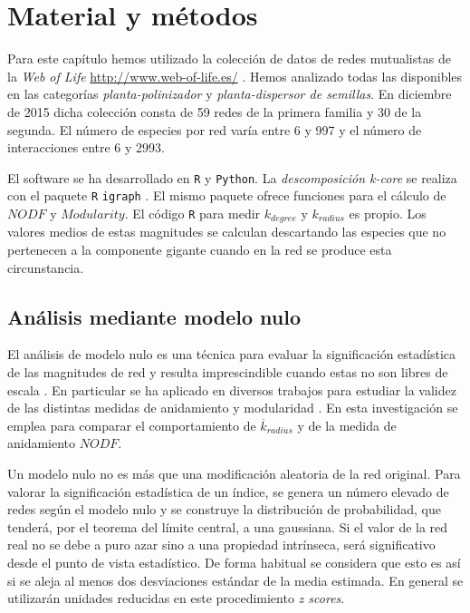 \section{Material y métodos}

Para este capítulo hemos utilizado la colección de datos de redes mutualistas de la \textit{Web of Life}  \url{http://www.web-of-life.es/} \cite{fortuna2014web}. Hemos analizado todas las disponibles en las categorías \textit{planta-polinizador} y \textit{planta-dispersor de semillas}. En diciembre de 2015 dicha colección consta de 59 redes de la primera familia y 30 de la segunda. El número de especies por red varía entre 6 y 997 y el número de interacciones entre 6 y 2993.

El software se ha desarrollado en \texttt{R} y \texttt{Python}. La \textit{descomposición k-core} se realiza con el paquete \texttt{R} \texttt{igraph} \cite{csardi2006igraph}. El mismo paquete ofrece funciones para el cálculo de $NODF$ y $Modularity$. El código \texttt{R} para medir ${k}_{degree}$ y ${k}_{radius}$ es propio. Los valores medios de estas magnitudes se calculan descartando las especies que no pertenecen a la componente gigante cuando en la red se produce esta circunstancia. 

\subsection{Análisis mediante modelo nulo}
\label{sec:nullmodels}

El análisis de modelo nulo es una técnica para evaluar la significación estadística de las magnitudes de red y resulta imprescindible cuando estas no son libres de escala \cite{gotelli1996null}. En particular se ha aplicado en diversos trabajos para estudiar la validez de las distintas medidas de anidamiento \cite{ulrich2013pattern, feng2014heterogeneity} y modularidad \cite{fortuna2010nestedness, mello2011modularity}. En esta investigación se emplea para comparar el comportamiento de $\overline k_{radius}$ y de la medida de anidamiento $NODF$.

Un modelo nulo no es más que una modificación aleatoria de la red original. Para valorar la significación estadística de un índice, se genera un
número elevado de redes según el modelo nulo y se construye la distribución de probabilidad, que tenderá, por el teorema del límite central, a una gaussiana. Si el valor de la red real no se debe a puro azar sino a una propiedad intrínseca, será significativo desde el punto de vista estadístico. De forma habitual se considera que esto es así
si se aleja al menos dos desviaciones estándar de la media estimada. En general se utilizarán unidades reducidas en este procedimiento \textit{z scores}.

